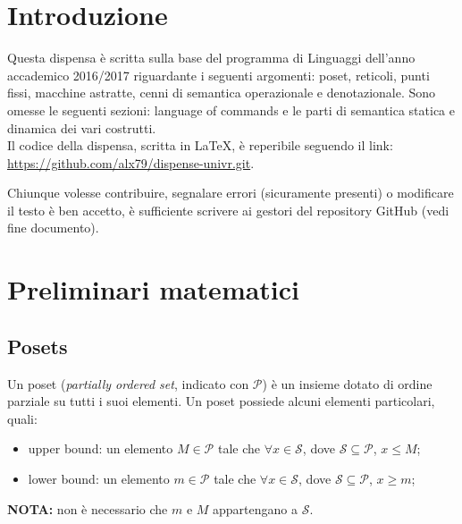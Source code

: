 \documentclass[a4paper, 10pt]{article}
\begin{document}
	\begin{frontespizio}
		\Preambolo{\usepackage{datetime}}
	\end{frontespizio}
	
	\tableofcontents
	
	\newpage
	
	\section{Introduzione}
	
	Questa dispensa è scritta sulla base del programma di Linguaggi dell'anno accademico 2016/2017
	riguardante i seguenti argomenti: poset, reticoli, punti fissi, macchine astratte, cenni di semantica 
	operazionale e denotazionale. Sono omesse le seguenti sezioni: language of commands e le parti di semantica statica e dinamica dei vari costrutti. \\
	
	\noindent
	Il codice della dispensa, scritta in \LaTeX, è reperibile seguendo il link: \\ \url{https://github.com/alx79/dispense-univr.git}.
	
	Chiunque volesse contribuire, segnalare errori (sicuramente presenti) o modificare il testo è ben accetto, è sufficiente scrivere ai gestori del repository GitHub (vedi fine documento).
	
	\section{Preliminari matematici}
	\subsection{Posets}
	
	Un poset (\textit{partially ordered set}, indicato con $\mathcal{P}$) è un insieme dotato di ordine parziale su tutti i suoi elementi. Un poset possiede alcuni elementi particolari, quali:
	\begin{itemize}
		\item upper bound: un elemento $M \in \mathcal{P}$ tale che $\forall x \in \mathcal{S}$, dove  $\mathcal{S} \subseteq \mathcal{P}$, $x \leq M$;
		\item lower bound: un elemento $m \in \mathcal{P}$ tale che $\forall x \in \mathcal{S}$, dove  $\mathcal{S} \subseteq \mathcal{P}$, $x \geq m$;
	\end{itemize}
	\textbf{NOTA:} non è necessario che $m$ e $M$ appartengano a $\mathcal{S}$. \\
	
\end{document}
